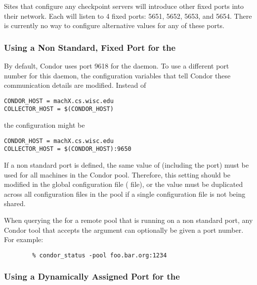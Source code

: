 Sites that configure any checkpoint servers will introduce
other fixed ports into their network.
Each  will listen to 4 fixed ports: 5651, 5652,
5653, and 5654.
There is currently no way to configure alternative values for any of
these ports.


\subsubsection{\label{sec:Ports-NonStandard}Using 
a Non Standard, Fixed Port for the }
By default,
Condor uses port 9618 for the  daemon.
To use a different port number for this daemon,
the configuration variables that tell Condor these communication
details are modified.
Instead of
\begin{verbatim}
CONDOR_HOST = machX.cs.wisc.edu
COLLECTOR_HOST = $(CONDOR_HOST)
\end{verbatim}
the configuration might be
\begin{verbatim}
CONDOR_HOST = machX.cs.wisc.edu
COLLECTOR_HOST = $(CONDOR_HOST):9650
\end{verbatim}

If a non standard port is defined, the same value of
 (including the port) must be used for all
machines in the Condor pool.
Therefore, this setting should be modified in the global
configuration file ( file),
or the value must be duplicated across
all configuration files in the pool if a single configuration file
is not being shared.

When querying the  for a remote pool that is running
on a non standard port, any Condor tool that accepts the 
argument can optionally be given a port number.  For example:
\footnotesize
\begin{verbatim}
        % condor_status -pool foo.bar.org:1234
\end{verbatim}
\normalsize


\subsubsection{\label{sec:Ports-Dynamic-Collector}Using 
a Dynamically Assigned Port for the }

